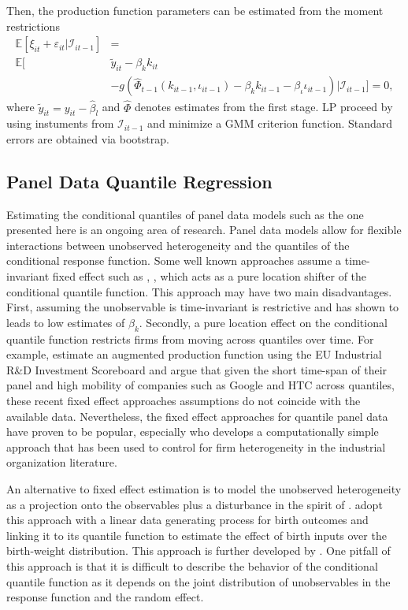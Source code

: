 \documentclass[11pt]{article}
\begin{document}
Then, the production function parameters can be estimated from the moment restrictions
\begin{equation}
\begin{split}
\mathbb{E}[\xi_{it}+\varepsilon_{it}|\mathcal{I}_{it-1}]&=\\
\mathbb{E}[&\tilde{y}_{it}-\beta_{k}k_{it}\\
&-g(\hat{\Phi}_{t-1}(k_{it-1}, \iota_{it-1})-\beta_{k}k_{it-1}-\beta_{\iota}\iota_{it-1})|\mathcal{I}_{it-1}]=0,
\end{split}
\end{equation}
where $\tilde{y}_{it}=y_{it}-\hat{\beta}_{l}$ and $\hat{\Phi}$ denotes estimates from the first stage. LP proceed by using instuments from $\mathcal{I}_{it-1}$ and minimize a GMM criterion function. Standard errors are obtained via bootstrap.
\subsection{Panel Data Quantile Regression}

Estimating the conditional quantiles of panel data models such as the one presented here is an ongoing area of research. Panel data models allow for flexible interactions between unobserved heterogeneity and the quantiles of the conditional response function. Some well known approaches assume a time-invariant fixed effect such as \cite{Koenker2004}, \cite{Lamarche2010}, \cite{Canay2011} which acts as a pure location shifter of the conditional quantile function. This approach may have two main disadvantages. First, assuming the unobservable is time-invariant is restrictive and \cite{Griliches1986} has shown to leads to low estimates of $\beta_{k}$. Secondly, a pure location effect on the conditional quantile function restricts firms from moving across quantiles over time. For example, \cite{Montresor2015} estimate an augmented production function using the EU Industrial R\&D Investment Scoreboard and argue that given the short time-span of their panel and high mobility of companies such as Google and HTC across quantiles, these recent fixed effect approaches assumptions do not coincide with the available data. Nevertheless, the fixed effect approaches for quantile panel data have proven to be popular, especially \cite{Canay2011} who develops a computationally simple approach that has been used to control for firm heterogeneity in the industrial organization literature.

An alternative to fixed effect estimation is to model the unobserved heterogeneity as a projection onto the observables plus a disturbance in the spirit of \cite{Chamberlain1984}. \cite{Abrevaya2008} adopt this approach with a linear data generating process for birth outcomes and linking it to its quantile function to estimate the effect of birth inputs over the birth-weight distribution. This approach is further developed by \cite*{Bache2012}. One pitfall of this approach is that it is difficult to describe the behavior of the conditional quantile function as it depends on the joint distribution of unobservables in the response function and the random effect.
\end{document}
